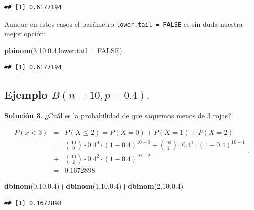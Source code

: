 \documentclass[]{book}
\newenvironment{Shaded}{\begin{snugshade}}{\end{snugshade}}
\newcommand{\DataTypeTok}[1]{\textcolor[rgb]{0.13,0.29,0.53}{#1}}
\newcommand{\DecValTok}[1]{\textcolor[rgb]{0.00,0.00,0.81}{#1}}
\newcommand{\FloatTok}[1]{\textcolor[rgb]{0.00,0.00,0.81}{#1}}
\newcommand{\KeywordTok}[1]{\textcolor[rgb]{0.13,0.29,0.53}{\textbf{#1}}}
\newcommand{\NormalTok}[1]{#1}
\newcommand{\OperatorTok}[1]{\textcolor[rgb]{0.81,0.36,0.00}{\textbf{#1}}}
\newcommand{\OtherTok}[1]{\textcolor[rgb]{0.56,0.35,0.01}{#1}}
\begin{document}
\begin{verbatim}
## [1] 0.6177194
\end{verbatim}

Aunque en estos casos el parámetro \texttt{lower.tail\ =\ FALSE} es sin duda nuestra mejor opción:

\begin{Shaded}
\begin{Highlighting}[]
\KeywordTok{pbinom}\NormalTok{(}\DecValTok{3}\NormalTok{,}\DecValTok{10}\NormalTok{,}\FloatTok{0.4}\NormalTok{,}\DataTypeTok{lower.tail =} \OtherTok{FALSE}\NormalTok{)}
\end{Highlighting}
\end{Shaded}

\begin{verbatim}
## [1] 0.6177194
\end{verbatim}

\hypertarget{ejemplo-bn10p0.4.-5}{%
\subsection{\texorpdfstring{Ejemplo \(B(n=10,p=0.4).\)}{Ejemplo B(n=10,p=0.4).}}\label{ejemplo-bn10p0.4.-5}}

\textbf{Solución 3}. ¿Cuál es la probabilidad de que saquemos menos de \(3\) rojas?

\[
\begin{eqnarray*}
P(x< 3)&=& P(X\leq 2)=  P(X=0)+P(X=1)+P(X=2)\\
&=& 
{10\choose 0}\cdot 0.4^0\cdot (1-0.4)^{10-0}+ {10\choose 1}\cdot 0.4^1\cdot (1-0.4)^{10-1}\\
&+&
{10\choose 2}\cdot 0.4^2\cdot (1-0.4)^{10-2}\\
&=&0.1672898
\end{eqnarray*}
.
\]

\begin{Shaded}
\begin{Highlighting}[]
\KeywordTok{dbinom}\NormalTok{(}\DecValTok{0}\NormalTok{,}\DecValTok{10}\NormalTok{,}\FloatTok{0.4}\NormalTok{)}\OperatorTok{+}\KeywordTok{dbinom}\NormalTok{(}\DecValTok{1}\NormalTok{,}\DecValTok{10}\NormalTok{,}\FloatTok{0.4}\NormalTok{)}\OperatorTok{+}\KeywordTok{dbinom}\NormalTok{(}\DecValTok{2}\NormalTok{,}\DecValTok{10}\NormalTok{,}\FloatTok{0.4}\NormalTok{)}
\end{Highlighting}
\end{Shaded}

\begin{verbatim}
## [1] 0.1672898
\end{verbatim}
\end{document}
